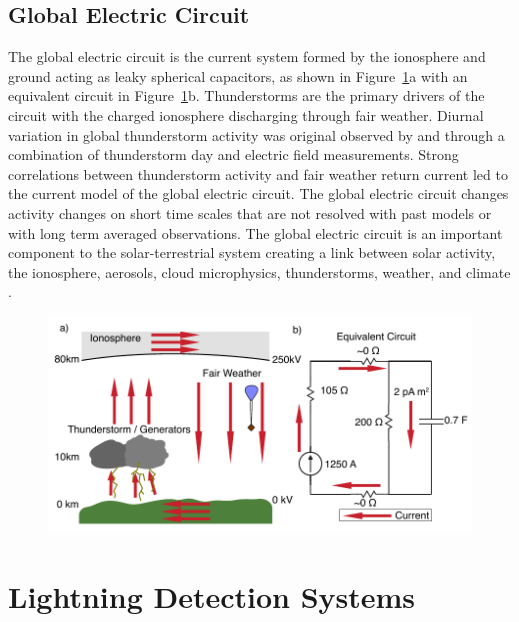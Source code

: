 \subsection{Global Electric Circuit}

The global electric circuit is the current system formed by the ionosphere and ground acting as leaky spherical capacitors, as shown in Figure~\ref{intro:fig:gec}a with an equivalent circuit in Figure~\ref{intro:fig:gec}b.
Thunderstorms are the primary drivers of the circuit with the charged ionosphere discharging through fair weather.
Diurnal variation in global thunderstorm activity was original observed by \citet{Wilson1921} and \citet{Whipple1929} through a combination of thunderstorm day and electric field measurements.
Strong correlations between thunderstorm activity and fair weather return current led to the current model of the global electric circuit.
The global electric circuit changes activity changes on short time scales that are not resolved with past models or with long term averaged observations.
The global electric circuit is an important component to the solar-terrestrial system creating a link between solar activity, the ionosphere, aerosols, cloud microphysics, thunderstorms, weather, and climate \citep{Tinsley2007, Holzworth1986}.

\begin{figure}[ht!]
	\centering
	\includegraphics[scale=1]{Introduction/Figures/Global_Circuit.pdf}\\
	\caption{}
	\label{intro:fig:gec}
\end{figure}

\section{Lightning Detection Systems}

